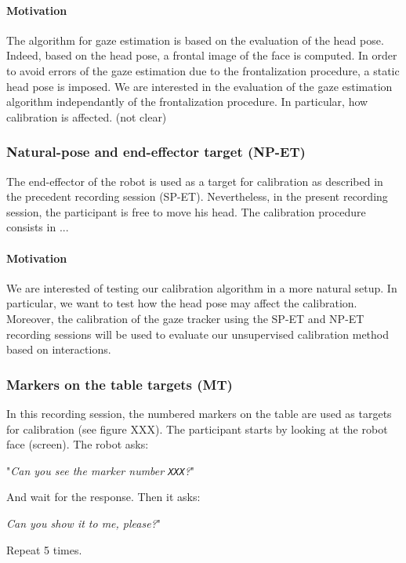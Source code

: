 \documentclass[11pt,a4paper]{article}
\begin{document}
\paragraph{Motivation}
The algorithm for gaze estimation is based on the evaluation of the head pose. Indeed, based on the head pose, a frontal image of the face is computed. In order to avoid errors of the gaze estimation due to the frontalization procedure, a static head pose is imposed. We are interested in the evaluation of the gaze estimation algorithm independantly of the frontalization procedure. In particular, how calibration is affected. (not clear)

\subsubsection{Natural-pose and end-effector target (NP-ET)}
The end-effector of the robot is used as a target for calibration as described in the precedent recording session (SP-ET). Nevertheless, in the present recording session, the participant is free to move his head. The calibration procedure consists in ...
\paragraph{Motivation}
We are interested of testing our calibration algorithm in a more natural setup. In particular, we want to test how the head pose may affect the calibration. Moreover, the calibration of the gaze tracker using the SP-ET and NP-ET recording sessions will be used to evaluate our unsupervised calibration method based on interactions.

\subsubsection{Markers on the table targets (MT)}
In this recording session, the numbered markers on the table are used as targets for calibration (see figure XXX). The participant starts by looking at the robot face (screen). The robot asks: 
\begin{center}
"\textit{Can you see the marker number \texttt{XXX}?}" 
\end{center}
And wait for the response. Then it asks: 
\begin{center}
\textit{Can you show it to me, please?}"
\end{center}
 Repeat 5 times.
\end{document}
